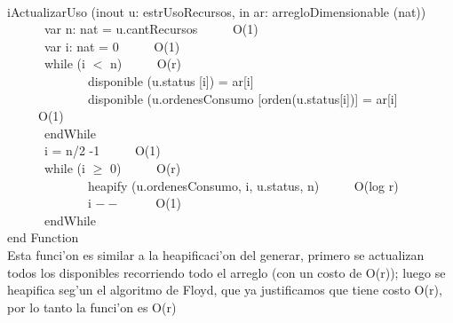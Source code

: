 \documentclass[a4paper,10pt]{article}
\begin{document}
\begin{algoritmo}
\caption{}\\
iActualizarUso (inout u: estrUsoRecursos, in ar: arregloDimensionable (nat)) \\
	\indent \ \ \ \ \ \  var n: nat = u.cantRecursos  \ \ \ \ \ O(1)\\
	\indent \ \ \ \ \ \  var i: nat = 0  \ \ \ \ \ O(1)\\  
	\indent \ \ \ \ \ \  while (i $<$ n)  \ \ \ \ \ O(r)\\
	\indent \ \ \ \ \ \ \ \ \ \ \ \ \ disponible (u.status [i]) = ar[i] \\	
	\indent \ \ \ \ \ \ \ \ \ \ \ \ \ disponible (u.ordenesConsumo [orden(u.status[i])] =  ar[i] \ \ \ \ \ O(1) \\
	\indent \ \ \ \ \ \  endWhile \ \ \ \ \ \\ 
	\indent \ \ \ \ \ \  i = n/2 -1  \ \ \ \ \ O(1)\\
	\indent \ \ \ \ \ \  while (i $\geq$ 0)  \ \ \ \ \ O(r)\\
	\indent \ \ \ \ \ \ \ \ \ \ \ \ \ heapify (u.ordenesConsumo, i, u.status, n) \ \ \ \ \ O(log r) \\
	\indent \ \ \ \ \ \ \ \ \ \ \ \ \ i $--$ \ \ \ \ \ O(1) \\
	\indent \ \ \ \ \ \  endWhile    \\
   end Function \\

Esta funci'on es similar a la heapificaci'on del generar, primero se actualizan todos los disponibles recorriendo todo el arreglo (con un costo de O(r)); luego se heapifica seg'un el algoritmo de Floyd, que ya justificamos que tiene costo O(r), por lo tanto la funci'on es O(r)

\end{algoritmo}
\end{document}
